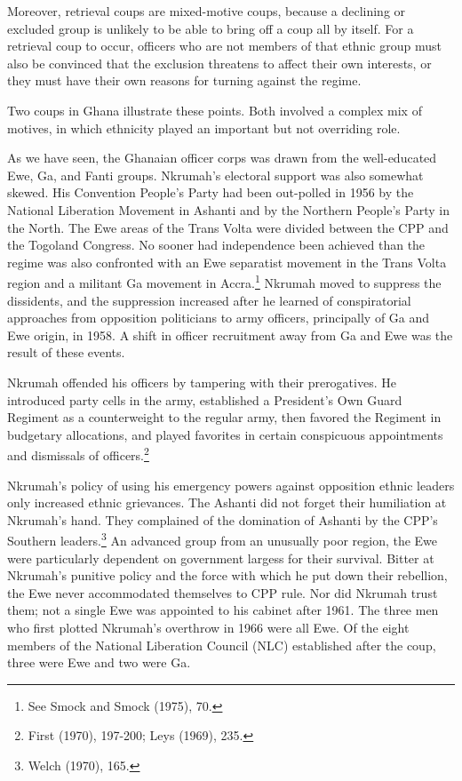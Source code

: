 \documentclass[
  letterpaper,
  DIV=11,
  numbers=noendperiod]{scrartcl}
\begin{document}
Moreover, retrieval coups are mixed-motive coups, because a declining or
excluded group is unlikely to be able to bring off a coup all by itself.
For a retrieval coup to occur, officers who are not members of that
ethnic group must also be convinced that the exclusion threatens to
affect their own interests, or they must have their own reasons for
turning against the regime.

Two coups in Ghana illustrate these points. Both involved a complex mix
of motives, in which ethnicity played an important but not overriding
role.

As we have seen, the Ghanaian officer corps was drawn from the
well-educated Ewe, Ga, and Fanti groups. Nkrumah's electoral support was
also somewhat skewed. His Convention People's Party had been out-polled
in 1956 by the National Liberation Movement in Ashanti and by the
Northern People's Party in the North. The Ewe areas of the Trans Volta
were divided between the CPP and the Togoland Congress. No sooner had
independence been achieved than the regime was also confronted with an
Ewe separatist movement in the Trans Volta region and a militant Ga
movement in Accra.\footnote{See Smock and Smock (1975), 70.} Nkrumah
moved to suppress the dissidents, and the suppression increased after he
learned of conspiratorial approaches from opposition politicians to army
officers, principally of Ga and Ewe origin, in 1958. A shift in officer
recruitment away from Ga and Ewe was the result of these events.

Nkrumah offended his officers by tampering with their prerogatives. He
introduced party cells in the army, established a President's Own Guard
Regiment as a counterweight to the regular army, then favored the
Regiment in budgetary allocations, and played favorites in certain
conspicuous appointments and dismissals of officers.\footnote{First
  (1970), 197-200; Leys (1969), 235.}

Nkrumah's policy of using his emergency powers against opposition ethnic
leaders only increased ethnic grievances. The Ashanti did not forget
their humiliation at Nkrumah's hand. They complained of the domination
of Ashanti by the CPP's Southern leaders.\footnote{Welch (1970), 165.}
An advanced group from an unusually poor region, the Ewe were
particularly dependent on government largess for their survival. Bitter
at Nkrumah's punitive policy and the force with which he put down their
rebellion, the Ewe never accommodated themselves to CPP rule. Nor did
Nkrumah trust them; not a single Ewe was appointed to his cabinet after
1961. The three men who first plotted Nkrumah's overthrow in 1966 were
all Ewe. Of the eight members of the National Liberation Council (NLC)
established after the coup, three were Ewe and two were Ga.
\end{document}
